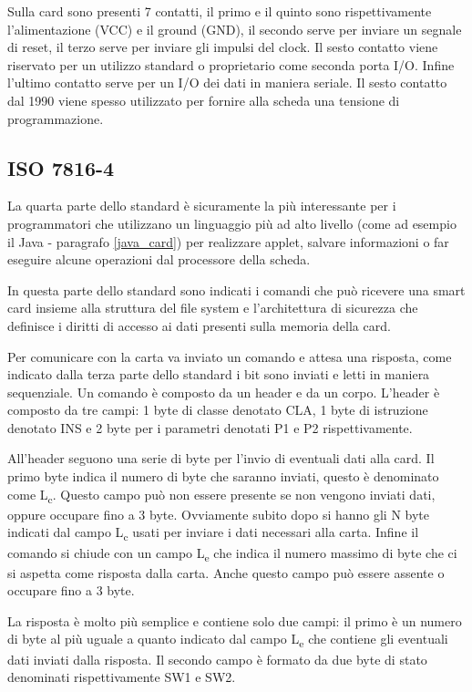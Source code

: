 Sulla card sono presenti 7 contatti, il primo e il quinto sono rispettivamente l'alimentazione (VCC) e il ground (GND), il secondo serve per inviare un segnale di reset, il terzo serve per inviare gli impulsi del clock. Il sesto contatto viene riservato per un utilizzo standard o proprietario come seconda porta I/O. Infine l'ultimo contatto serve per un I/O dei dati in maniera seriale. Il sesto contatto dal 1990 viene spesso utilizzato per fornire alla scheda una tensione di programmazione.
\cite{isoiec3}

\subsection{ISO 7816-4}
La quarta parte dello standard è sicuramente la più interessante per i programmatori che utilizzano un linguaggio più ad alto livello (come ad esempio il Java - paragrafo \ref{java_card}) per realizzare applet, salvare informazioni o far eseguire alcune operazioni dal processore della scheda.

In questa parte dello standard sono indicati i comandi che può ricevere una smart card insieme alla struttura del file system e l'architettura di sicurezza che definisce i diritti di accesso ai dati presenti sulla memoria della card.

Per comunicare con la carta va inviato un comando e attesa una risposta, come indicato dalla terza parte dello standard i bit sono inviati e letti in maniera sequenziale. Un comando è composto da un header e da un corpo. L'header è composto da tre campi: 1 byte di classe denotato CLA, 1 byte di istruzione denotato INS e 2 byte per i parametri denotati P1 e P2 rispettivamente.

All'header seguono una serie di byte per l'invio di eventuali dati alla card. Il primo byte indica il numero di byte che saranno inviati, questo è denominato come L\textsubscript{c}. Questo campo può non essere presente se non vengono inviati dati, oppure occupare fino a 3 byte. Ovviamente subito dopo si hanno gli N byte indicati dal campo L\textsubscript{c} usati per inviare i dati necessari alla carta. Infine il comando si chiude con un campo L\textsubscript{e} che indica il numero massimo di byte che ci si aspetta come risposta dalla carta. Anche questo campo può essere assente o occupare fino a 3 byte.

La risposta è molto più semplice e contiene solo due campi: il primo è un numero di byte al più uguale a quanto indicato dal campo L\textsubscript{e} che contiene gli eventuali dati inviati dalla risposta. Il secondo campo è formato da due byte di stato denominati rispettivamente SW1 e SW2.

